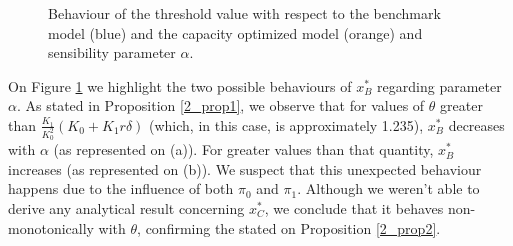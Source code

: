 	\begin{figure}[!htb]
		\begin{subfigmatrix}{2}
		\end{subfigmatrix}
		\caption{Behaviour of the threshold value with respect to the benchmark model (blue) and the capacity optimized model (orange) and sensibility parameter $\alpha$.}
		\label{fig:2_x4}
	\end{figure}
	
On Figure \ref{fig:2_x4} we highlight the two possible behaviours of $x^*_B$ regarding parameter $\alpha$. As stated in Proposition \ref{2_prop1}, we observe that for values of $\theta$ greater than $\frac{K_1}{ K_0^2} (K_0+K_1 r \delta)$ (which, in this case, is approximately 1.235), $x^*_B$ decreases with $\alpha$ (as represented on (a)). For greater values than that quantity, $x^*_B$ increases (as represented on (b)). We suspect that this unexpected behaviour happens due to the influence of both $\pi_0$ and $\pi_1$.
Although we weren't able to derive any analytical result concerning $x^*_C$, we conclude that it behaves non-monotonically with $\theta$, confirming the stated on Proposition \ref{2_prop2}.



